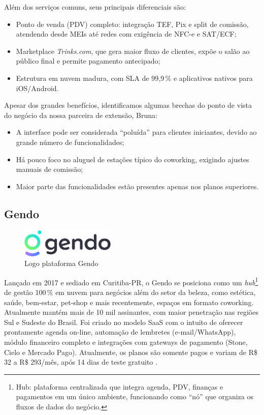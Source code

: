 Além dos serviços comuns, seus principais diferenciais são:

\begin{itemize}
	\item Ponto de venda (PDV) completo: integração TEF, Pix e split de comissão, atendendo desde
	MEIs até redes com exigência de NFC-e e SAT/ECF;
	\item Marketplace \textit{Trinks.com}, que gera maior fluxo de clientes, expõe o salão ao
	público final e permite pagamento antecipado;
	\item Estrutura em nuvem madura, com SLA de 99{,}9\,\% e aplicativos nativos para
	iOS/Android.
\end{itemize}

Apesar dos grandes benefícios, identificamos algumas brechas do ponto de vista do negócio da nossa
parceira de extensão, Bruna:

\begin{itemize}
	\item A interface pode ser considerada “poluída” para clientes iniciantes, devido ao grande
	número de funcionalidades;
	\item Há pouco foco no aluguel de estações típico do coworking, exigindo ajustes manuais de
	comissão;
	\item Maior parte das funcionalidades estão presentes apenas nos planos superiores.
\end{itemize}

\subsection{Gendo}

\begin{figure}[htb]
	\centering
	\includegraphics[width=0.4\textwidth]{cap01-Introducao/Images/1.4.2_Gendo}
	\caption{Logo plataforma Gendo}
	\label{fig:Gendo}
\end{figure}

Lançado em 2017 e sediado em Curitiba-PR, o Gendo se posiciona como um \emph{hub}\footnote{Hub: plataforma centralizada que integra agenda, PDV, finanças e pagamentos em um único ambiente, funcionando como “nó” que organiza os fluxos de dados do negócio.} de gestão 100\,\% em nuvem para negócios além do setor da beleza, como estética, saúde, bem-estar, pet-shop e mais recentemente, espaços em formato coworking. 
Atualmente mantém mais de 10 mil assinantes, com maior penetração nas regiões Sul e Sudeste do Brasil. Foi criado no modelo SaaS com o intuito de oferecer prontamente agenda on-line, automação de lembretes (e-mail/WhatsApp), módulo financeiro completo e integrações com gateways de pagamento (Stone, Cielo e Mercado Pago). Atualmente, os planos são somente pagos e variam de R\$ 32 a R\$ 293/mês, após 14 dias de teste gratuito \cite{Gendo}.

